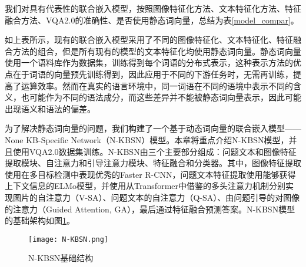 我们对具有代表性的联合嵌入模型，按照图像特征化方法、文本特征化方法、特征融合方法、VQA2.0的准确性、是否使用静态词向量，总结为表\ref{model_compar}。
\begin{table}[H]
\centering
\caption{代表性联合嵌入模型的比较}
\label{model_compar}
\end{table}

如上表所示，现有的联合嵌入模型采用了不同的图像特征化、文本特征化、特征融合方法的组合，但是所有现有的模型的文本特征化均使用静态词向量。静态词向量使用一个语料库作为数据集，训练得到每个词语的分布式表示，这种表示方法的优点在于词语的向量预先训练得到，因此应用于不同的下游任务时，无需再训练，提高了运算效率。然而在真实的语言环境中，同一词语在不同的语境中表示不同的含义，也可能作为不同的语法成分，而这些差异并不能被静态词向量表示，因此可能出现语义和语法的偏差。

为了解决静态词向量的问题，我们构建了一个基于动态词向量的联合嵌入模型——None KB-Specific Network（N-KBSN）模型。本章将重点介绍N-KBSN模型，并且使用VQA2.0数据集训练。N-KBSN由三个主要部分组成：问题文本和图像特征提取模块、自注意力和引导注意力模块、特征融合和分类器。其中，图像特征提取使用在多目标检测中表现优秀的Faster R-CNN，问题文本特征提取使用能够获得上下文信息的ELMo模型，并使用从Transformer中借鉴的多头注意力机制分别实现图片的自注意力（V-SA）、问题文本的自注意力（Q-SA）、由问题引导的对图像的注意力（Guided Attention, GA），最后通过特征融合预测答案。N-KBSN模型的基础架构如图\ref{N-KBSN}。
\begin{figure}[H]
	\texttt{[image: N-KBSN.png]}
	\caption{N-KBSN基础结构}
	\label{N-KBSN}
\end{figure}

